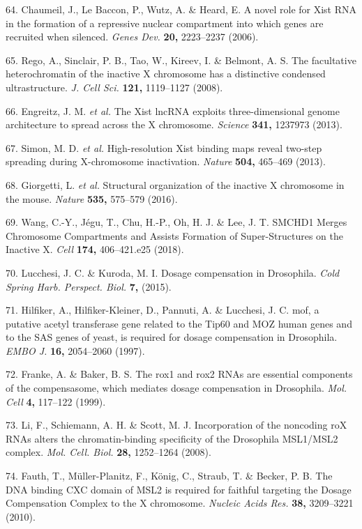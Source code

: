 \documentclass[11pt,twoside]{MPIthesis}
\theoremstyle{definition}
\theoremstyle{definition}
\theoremstyle{definition}
\theoremstyle{remark}
\begin{document}
64. Chaumeil, J., Le Baccon, P., Wutz, A. \& Heard, E. A novel role for
Xist RNA in the formation of a repressive nuclear compartment into which
genes are recruited when silenced. \emph{Genes Dev.} \textbf{20,}
2223--2237 (2006).

65. Rego, A., Sinclair, P. B., Tao, W., Kireev, I. \& Belmont, A. S. The
facultative heterochromatin of the inactive X chromosome has a
distinctive condensed ultrastructure. \emph{J. Cell Sci.} \textbf{121,}
1119--1127 (2008).

66. Engreitz, J. M. \emph{et al.} The Xist lncRNA exploits
three-dimensional genome architecture to spread across the X chromosome.
\emph{Science} \textbf{341,} 1237973 (2013).

67. Simon, M. D. \emph{et al.} High-resolution Xist binding maps reveal
two-step spreading during X-chromosome inactivation. \emph{Nature}
\textbf{504,} 465--469 (2013).

68. Giorgetti, L. \emph{et al.} Structural organization of the inactive
X chromosome in the mouse. \emph{Nature} \textbf{535,} 575--579 (2016).

69. Wang, C.-Y., Jégu, T., Chu, H.-P., Oh, H. J. \& Lee, J. T. SMCHD1
Merges Chromosome Compartments and Assists Formation of Super-Structures
on the Inactive X. \emph{Cell} \textbf{174,} 406--421.e25 (2018).

70. Lucchesi, J. C. \& Kuroda, M. I. Dosage compensation in Drosophila.
\emph{Cold Spring Harb. Perspect. Biol.} \textbf{7,} (2015).

71. Hilfiker, A., Hilfiker-Kleiner, D., Pannuti, A. \& Lucchesi, J. C.
mof, a putative acetyl transferase gene related to the Tip60 and MOZ
human genes and to the SAS genes of yeast, is required for dosage
compensation in Drosophila. \emph{EMBO J.} \textbf{16,} 2054--2060
(1997).

72. Franke, A. \& Baker, B. S. The rox1 and rox2 RNAs are essential
components of the compensasome, which mediates dosage compensation in
Drosophila. \emph{Mol. Cell} \textbf{4,} 117--122 (1999).

73. Li, F., Schiemann, A. H. \& Scott, M. J. Incorporation of the
noncoding roX RNAs alters the chromatin-binding specificity of the
Drosophila MSL1/MSL2 complex. \emph{Mol. Cell. Biol.} \textbf{28,}
1252--1264 (2008).

74. Fauth, T., Müller-Planitz, F., König, C., Straub, T. \& Becker, P.
B. The DNA binding CXC domain of MSL2 is required for faithful targeting
the Dosage Compensation Complex to the X chromosome. \emph{Nucleic Acids
Res.} \textbf{38,} 3209--3221 (2010).
\end{document}
